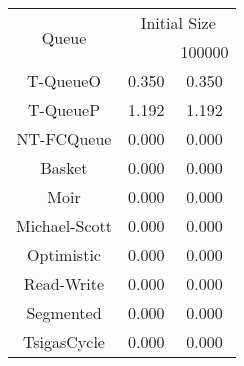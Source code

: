 \begin{tabular}{|c|c|c|}
\hline
\multirow{2}{*}{Queue} & \multicolumn{2}{c|}{Initial Size}\\\cline{2-3}& \qquad 10000 \qquad\quad & 100000\\
\hline
\hline
T-QueueO & 0.350 & 0.350\\
T-QueueP & 1.192 & 1.192\\
NT-FCQueue & 0.000 & 0.000\\
Basket & 0.000 & 0.000\\
Moir & 0.000 & 0.000\\
Michael-Scott & 0.000 & 0.000\\
Optimistic & 0.000 & 0.000\\
Read-Write & 0.000 & 0.000\\
Segmented & 0.000 & 0.000\\
TsigasCycle & 0.000 & 0.000\\
\hline\end{tabular}
